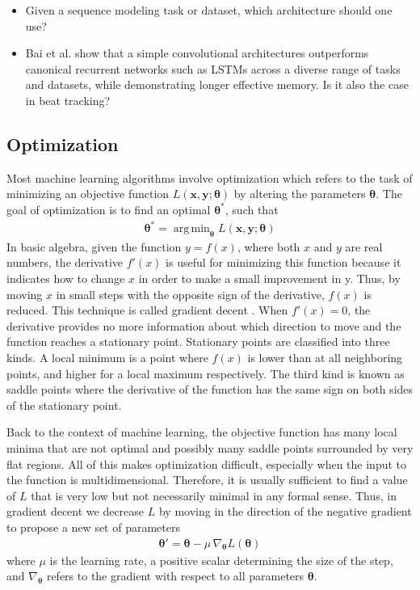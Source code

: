 \documentclass{scrartcl}
\DeclareMathOperator*{\argmin}{arg\,min}
\begin{document}
\begin{itemize}
\item Given a sequence modeling task or dataset, which architecture should one use?
\item Bai et al. \cite{Bai2018} show that a simple convolutional architectures outperforms canonical recurrent networks such as LSTMs across a diverse range of tasks and datasets, while demonstrating longer effective memory. Is it also the case in beat tracking?
\end{itemize}


\subsection{Optimization}

Most machine learning algorithms involve optimization which refers to the task of minimizing an objective function $L(\mathbf x, \mathbf y; \boldsymbol \theta)$ by altering the parameters $\boldsymbol \theta$. The goal of optimization is to find an optimal $\boldsymbol \theta^*$, such that
\begin{align}
\boldsymbol \theta^* = \argmin_{\boldsymbol \theta} L(\mathbf x, \mathbf y; \boldsymbol \theta)
\end{align} 
In basic algebra, given the function $y=f(x)$, where both $x$ and $y$ are real numbers, the derivative $f'(x)$ is useful for minimizing this function because it indicates how to change $x$ in order to make a small improvement in y. Thus, by moving $x$ in small steps with the opposite sign of the derivative, $f(x)$ is reduced. This technique is called gradient decent \cite{Cauchy1847}. When $f'(x)=0$, the derivative provides no more information about which direction to move and the function reaches a stationary point. Stationary points are classified into three kinds. A local minimum is a point where $f(x)$ is lower than at all neighboring points, and higher for a local maximum respectively. The third kind is known as saddle points where the derivative of the function has the same sign on both sides of the stationary point.  

Back to the context of machine learning, the objective function has many local minima that are not optimal and possibly many saddle points surrounded by very flat regions. All of this makes optimization difficult, especially when the input to the function is multidimensional. Therefore, it is usually sufficient to find a value of $L$ that is very low but not necessarily minimal in any formal sense. Thus, in gradient decent we decrease $L$ by moving in the direction of the negative gradient to propose a new set of parameters
\begin{align}
\boldsymbol \theta' = \boldsymbol \theta - \mu \,\nabla_{\boldsymbol \theta}L(\boldsymbol \theta)
\end{align} 
where $\mu$ is the learning rate, a positive scalar determining the size of the step, and $\nabla_{\boldsymbol \theta}$ refers to the gradient with respect to all parameters $\boldsymbol \theta$.
\end{document}

